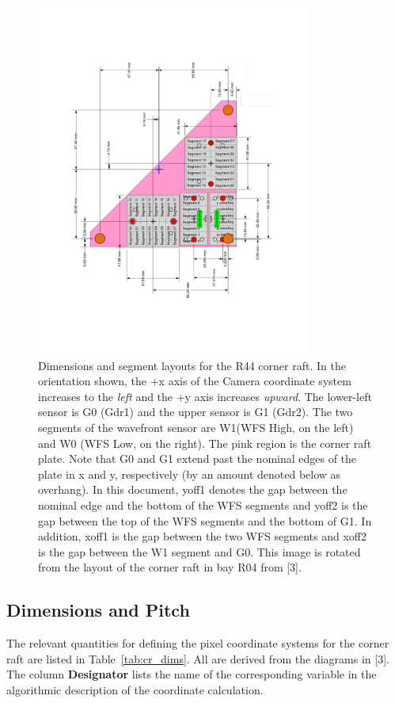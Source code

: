 \documentclass{article}[12pt]
\begin{document}
{\begin{figure}
\centering
    \includegraphics[width=0.8\textwidth]{CR_R44.pdf}
    \caption{Dimensions and segment layouts for the R44 corner raft.  In the orientation shown, the +x axis of the Camera coordinate system increases to the {\em left} and the +y axis increases {\em upward}.  The lower-left sensor is G0 (Gdr1) and the upper sensor is G1 (Gdr2).  The two segments of the wavefront sensor are W1(WFS High, on the left) and W0 (WFS Low, on the right).  The pink region is the corner raft plate.  Note that G0 and G1 extend past the nominal edges of the plate in x and y, respectively (by an amount denoted below as overhang).  In this document, yoff1 denotes the gap between the nominal edge and the bottom of the WFS segments and yoff2 is the gap between the top of the WFS segments and the bottom of G1.  In addition, xoff1 is the gap between the two WFS segments and xoff2 is the gap between the W1 segment and G0. This image is rotated from the layout of the corner raft in bay R04 from [3].  }
    \label{fig:CRlayout}
\end{figure}

\subsection{Dimensions and Pitch}
The relevant quantities for defining the pixel coordinate systems for the corner raft are listed in Table~\ref{tab:cr_dims}.  All are derived from the diagrams in [3].  The column {\bf Designator} lists the name of the corresponding variable in the algorithmic description of the coordinate calculation.  

}
\end{document}
